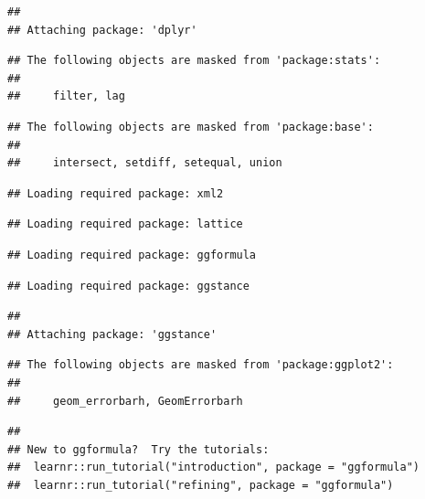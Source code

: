 \documentclass[
]{book}
\newenvironment{Shaded}{\begin{snugshade}}{\end{snugshade}}
\newcommand{\CommentTok}[1]{\textcolor[rgb]{0.56,0.35,0.01}{\textit{#1}}}
\newcommand{\DataTypeTok}[1]{\textcolor[rgb]{0.13,0.29,0.53}{#1}}
\newcommand{\DecValTok}[1]{\textcolor[rgb]{0.00,0.00,0.81}{#1}}
\newcommand{\KeywordTok}[1]{\textcolor[rgb]{0.13,0.29,0.53}{\textbf{#1}}}
\newcommand{\NormalTok}[1]{#1}
\newcommand{\OperatorTok}[1]{\textcolor[rgb]{0.81,0.36,0.00}{\textbf{#1}}}
\newcommand{\StringTok}[1]{\textcolor[rgb]{0.31,0.60,0.02}{#1}}
\begin{document}
\begin{Shaded}
\end{Shaded}

\begin{verbatim}
## 
## Attaching package: 'dplyr'
\end{verbatim}

\begin{verbatim}
## The following objects are masked from 'package:stats':
## 
##     filter, lag
\end{verbatim}

\begin{verbatim}
## The following objects are masked from 'package:base':
## 
##     intersect, setdiff, setequal, union
\end{verbatim}

\begin{verbatim}
## Loading required package: xml2
\end{verbatim}

\begin{verbatim}
## Loading required package: lattice
\end{verbatim}

\begin{verbatim}
## Loading required package: ggformula
\end{verbatim}

\begin{verbatim}
## Loading required package: ggstance
\end{verbatim}

\begin{verbatim}
## 
## Attaching package: 'ggstance'
\end{verbatim}

\begin{verbatim}
## The following objects are masked from 'package:ggplot2':
## 
##     geom_errorbarh, GeomErrorbarh
\end{verbatim}

\begin{verbatim}
## 
## New to ggformula?  Try the tutorials: 
## 	learnr::run_tutorial("introduction", package = "ggformula")
## 	learnr::run_tutorial("refining", package = "ggformula")
\end{verbatim}
\end{document}
